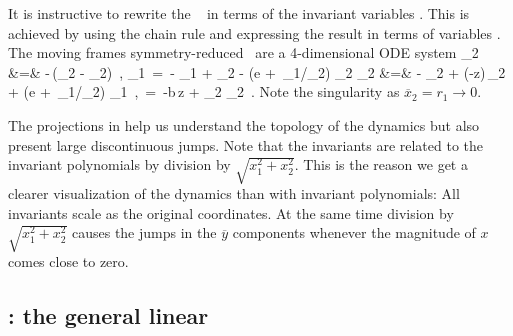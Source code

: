 \documentclass[preprint,number,sort&compress]{elsarticle}
\begin{document}
It is instructive to rewrite the \cLe~ in terms
of the invariant variables . This is
achieved by using the chain rule  and
expressing the result in terms of variables
. The moving frames symmetry-reduced \cLe\
are a 4-dimensional ODE system
\bea
	_2 &=& -\sigma \,(_2 - _2)
\,,\quad
	_1 \,=\, - _1 + \ImrCLor {}_2
  - \left(e + {\sigma\,_1}/{\overline{x}_2}\right) \overline{y}_2
\continue
	_2 &=&  - _2 + (\RerCLor-z)\,_2
   + \left(e + {\sigma\,_1}/{\overline{x}_2}\right) \overline{y}_1
\,,\quad
	\; \,=\, -b\,z + _2 _2
\,.
\label{eq:rdcdCLeR}
\eea
Note the singularity as $\overline{x}_2=r_1\rightarrow 0$.

The projections in  help us understand the
topology of the dynamics but also present large discontinuous jumps.
Note that the in\-vari\-ants \refeq{eq:invLaser} are related to
the in\-vari\-ant polynomials  by division by
$\sqrt{x_1^2+x_2^2}$. This is the reason we get a clearer
visualization of the dynamics than with in\-vari\-ant
polynomials: All in\-vari\-ants scale as the original
coordinates. At the same time division by
$\sqrt{x_1^2+x_2^2}$ causes the jumps in the $\overline{y}$
components whenever the magnitude of $x$ comes close to zero.


\subsection{\label{s:mfReqb}\CLe: the general linear \slice}
\end{document}
